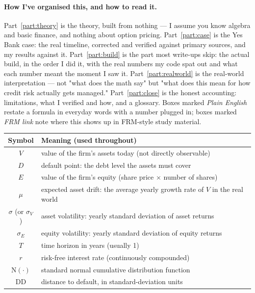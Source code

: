 \documentclass[11pt,a4paper]{article}
\newcommand{\Ncdf}{\mathrm{N}}          %
\newcommand{\DD}{\mathrm{DD}}
\begin{document}
\paragraph{How I've organised this, and how to read it.} Part~\ref{part:theory} is the theory, built from nothing — I assume you know algebra and basic finance, and nothing about option pricing. Part~\ref{part:case} is the Yes Bank case: the real timeline, corrected and verified against primary sources, and my results against it. Part~\ref{part:build} is the part most write-ups skip: the actual build, in the order I did it, with the real numbers my code spat out and what each number meant the moment I saw it. Part~\ref{part:realworld} is the real-world interpretation — not "what does the math say" but "what does this mean for how credit risk actually gets managed." Part~\ref{part:close} is the honest accounting: limitations, what I verified and how, and a glossary. Boxes marked \emph{Plain English} restate a formula in everyday words with a number plugged in; boxes marked \emph{FRM link} note where this shows up in FRM-style study material.

\begin{table}[H]\centering\small
\begin{tabular}{@{}cp{10.8cm}@{}}\toprule
\textbf{Symbol} & \textbf{Meaning (used throughout)}\\\midrule
$V$ & value of the firm's assets today (not directly observable)\\
$D$ & default point: the debt level the assets must cover\\
$E$ & value of the firm's equity (share price $\times$ number of shares)\\
$\mu$ & expected asset drift: the average yearly growth rate of $V$ in the real world\\
$\sigma$ (or $\sigma_V$) & asset volatility: yearly standard deviation of asset returns\\
$\sigma_E$ & equity volatility: yearly standard deviation of equity returns\\
$T$ & time horizon in years (usually 1)\\
$r$ & risk-free interest rate (continuously compounded)\\
$\Ncdf(\cdot)$ & standard normal cumulative distribution function\\
$\DD$ & distance to default, in standard-deviation units\\\bottomrule
\end{tabular}
\end{table}
\end{document}
